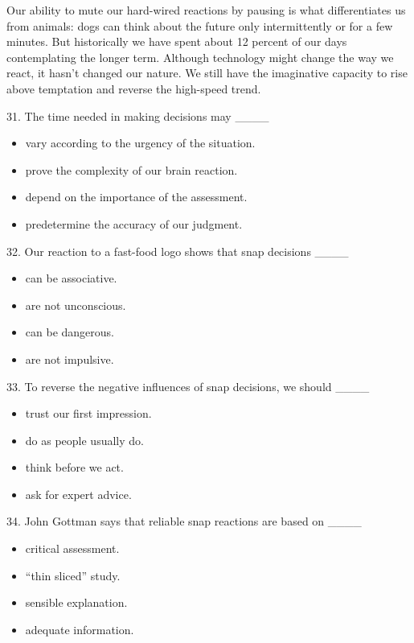 \documentclass[UTF8,11pt]{ctexart}
\begin{document}
Our ability to mute our hard-wired reactions by pausing is what differentiates us from animals: dogs can think about the future only intermittently or for a few minutes. But historically we have spent about 12 percent of our days contemplating the longer term. Although technology might change the way we react, it hasn’t changed our nature. We still have the imaginative capacity to rise above temptation and reverse the high-speed trend.


31. The time needed in making decisions may \_\_\_\_


\begin{itemize}[leftmargin=2em,itemsep=.2em,topsep=.4em]\item[A.] vary according to the urgency of the situation.
\item[B.] prove the complexity of our brain reaction.
\item[C.] depend on the importance of the assessment.
\item[D.] predetermine the accuracy of our judgment.
\end{itemize}

32. Our reaction to a fast-food logo shows that snap decisions \_\_\_\_


\begin{itemize}[leftmargin=2em,itemsep=.2em,topsep=.4em]\item[A.] can be associative.
\item[B.] are not unconscious.
\item[C.] can be dangerous.
\item[D.] are not impulsive.
\end{itemize}

33. To reverse the negative influences of snap decisions, we should \_\_\_\_


\begin{itemize}[leftmargin=2em,itemsep=.2em,topsep=.4em]\item[A.] trust our first impression.
\item[B.] do as people usually do.
\item[C.] think before we act.
\item[D.] ask for expert advice.
\end{itemize}

34. John Gottman says that reliable snap reactions are based on \_\_\_\_


\begin{itemize}[leftmargin=2em,itemsep=.2em,topsep=.4em]\item[A.] critical assessment.
\item[B.] “thin sliced” study.
\item[C.] sensible explanation.
\item[D.] adequate information.
\end{itemize}
\end{document}
